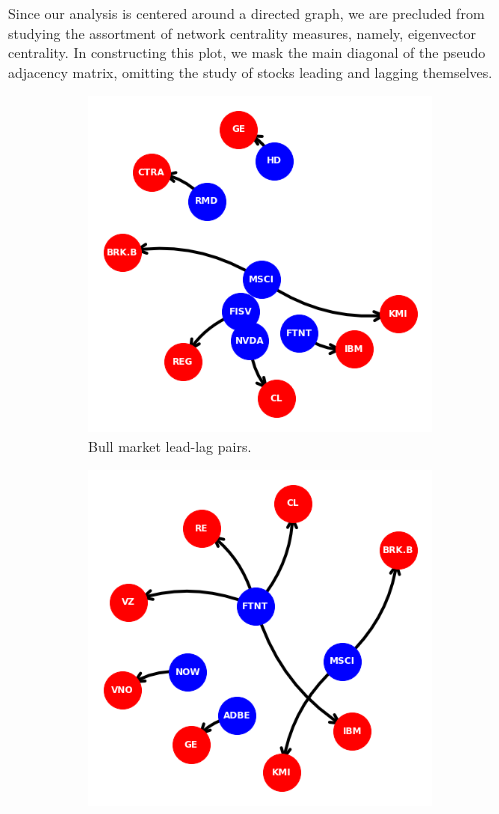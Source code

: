 \documentclass{article}
\begin{document}
Since our analysis is centered around a directed graph, we are precluded from studying the assortment of network centrality measures, namely, eigenvector centrality. In constructing this plot, we mask the main diagonal of the pseudo adjacency matrix, omitting the study of stocks leading and lagging themselves.
\begin{figure}[H]
    \centering
    \begin{subfigure}{0.45\textwidth}
        \centering
        \includegraphics[width=\linewidth]{bullNetwork.png}
        \caption{Bull market lead-lag pairs.}
        \label{fig:bullNetwork}
    \end{subfigure}
    \hfill
    \begin{subfigure}{0.45\textwidth}
        \centering
        \includegraphics[width=\linewidth]{bearNetwork.png}

\end{subfigure}
\end{figure}
\end{document}
